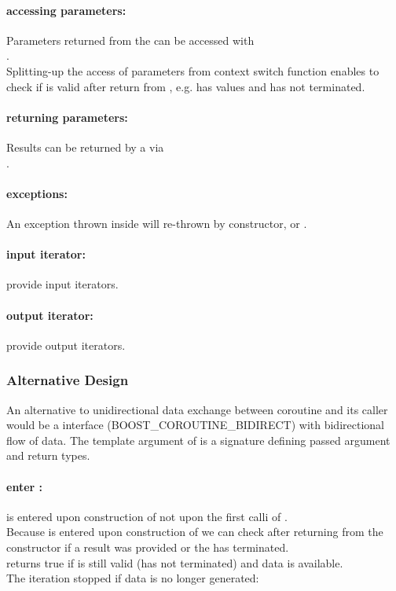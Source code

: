 \paragraph*{accessing parameters:}
Parameters returned from the \corofunction can be accessed with\\\pullcoroget.\\
\newline
Splitting-up the access of parameters from context switch function enables to
check if \pullcoro is valid after return from \pullcoroop, e.g. \pullcoro has
values and \corofunction has not terminated.

\paragraph*{returning parameters:}
Results can be returned by a \corofunction via\\\pushcoroop.\\

\paragraph*{exceptions:}
An exception thrown inside \corofunction will re-thrown by \pullcoro constructor,
\pullcoroop or \pushcoroop.

\paragraph*{input iterator:}
\pullcoro provide input iterators.

\paragraph*{output iterator:}
\pushcoro provide output iterators.


\subsubsection*{Alternative Design}
An alternative to unidirectional data exchange between coroutine and its caller
would be a interface (BOOST\_COROUTINE\_BIDIRECT) with bidirectional flow of
data. The template argument of \coro is a signature defining passed argument and
return types.

\paragraph*{enter \corofunction:}
\corofunction is entered upon construction of \coro not upon the first calli of
\coroop.\\
\newline
Because \corofunction is entered upon construction of \coro we can check after
returning from the constructor if a result was provided or the \corofunction
has terminated.\\
\corobool returns true if \coro is still valid (\corofunction has not terminated)
and data is available.\\
The iteration stopped if data is no longer generated:

